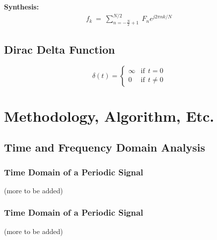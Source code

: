 \documentclass[10pt]{article}
\begin{document}
\textbf{Synthesis:}
\begin{equation} \label{eq:3.5.1}
\begin{aligned}
    f_k \: = \: \sum_{n=-\frac{N}{2}+1}^{N/2} \: F_n e^{j2\pi nk/ N}
\end{aligned}
\end{equation}

\subsection{Dirac Delta Function}

\[ \delta(t) = \begin{cases} \infty & \text{if} \:\: t = 0 \\ 0 & \text{if} \:\: t \neq 0 \end{cases}\]

\vspace{7cm}







\section{Methodology, Algorithm, Etc.}

\subsection{Time and Frequency Domain Analysis}

\subsubsection{Time Domain of a Periodic Signal}

\noindent(more to be added)

\subsubsection{Time Domain of a Periodic Signal}

\noindent(more to be added)
\end{document}
